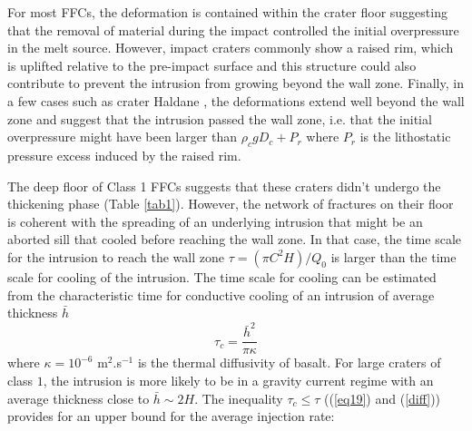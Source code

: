 \begin{article}
                For most FFCs, the deformation is contained within the
                crater floor  \citep{Schultz1976} suggesting  that the
                removal of  material during the impact  controlled the
                initial  overpressure  in  the melt  source.  However,
                impact craters  commonly show  a raised rim,  which is
                uplifted relative  to the pre-impact surface  and this
                structure  could   also  contribute  to   prevent  the
                intrusion from growing beyond  the wall zone. Finally,
                in   a    few   cases    such   as    crater   Haldane
                \citep{Schultz1976},  the   deformations  extend  well
                beyond the  wall zone  and suggest that  the intrusion
                passed   the  wall   zone,  i.e.   that  the   initial
                overpressure    might    have   been    larger    than
                $\rho_c  g D_c  +P_r$ where  $P_r$ is  the lithostatic
                pressure excess induced by the raised rim.
		
                The deep  floor of  Class 1  FFCs suggests  that these
                craters  didn't undergo  the  thickening phase  (Table
                \ref{tab1}).  However,  the  network of  fractures  on
                their  floor  is coherent  with  the  spreading of  an
                underlying  intrusion that  might be  an aborted  sill
                that  cooled before  reaching the  wall zone.  In that
                case, the  time scale for  the intrusion to  reach the
                wall zone $\tau=(\pi C^2  H)/Q_{0}$ is larger than the
                time  scale for  cooling  of the  intrusion. The  time
                scale   for  cooling   can  be   estimated  from   the
                characteristic  time  for  conductive  cooling  of  an
                intrusion of average thickness $\bar{h}$
                \begin{equation}
                  \tau_{c}= \frac{\bar{h}^{2}}{\pi\kappa}
                  \label{diff}
                \end{equation}
                where $\kappa=10^{-6}$ m$^{2}$.s$^{-1}$ is the thermal
                diffusivity of basalt. For large craters of class $1$,
                the  intrusion  is more  likely  to  be in  a  gravity
                current  regime with  an  average  thickness close  to
                $\bar{h}\sim2H$.  The inequality  $\tau_{c} \le  \tau$
                ((\ref{eq19}) and (\ref{diff}))  provides for an upper
                bound for the average injection rate:


\end{article}
